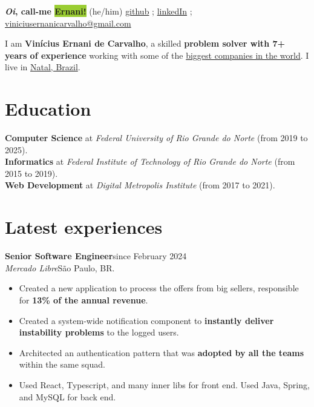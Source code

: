 \documentclass[12pt]{article}
\newcommand{\curiosity}[1]{\colorbox{YellowGreen}{#1}}
\newcommand{\highlight}[1]{#1}
\newcommand{\educationentry}[3]{\textbf{#1} at \textit{#2} (#3).}
\newcommand{\jobentry}[5]{\highlight{\textbf{#3}}\hfill #4\\\textit{#1}\hfill #2. #5\\\smallskip}
\newcommand{\spacer}[0]{\smallskip\hline\smallskip}
\begin{document}
\textbf{\large \textit{Oi}, call-me \curiosity{Ernani!}} {\large (he/him)} \hfill \href{https://github.com/erneani/}{github} ; \href{https://www.linkedin.com/in/vinicius-ernani/}{linkedIn} ; \href{mailto:viniciusernanicarvalho@gmail.com}{viniciusernanicarvalho@gmail.com}

\spacer

I am \textbf{Vinícius Ernani de Carvalho}, a skilled \textbf{problem solver with 7+ years of experience} working with some of the \underline{biggest companies in the world}. I live in \underline{Natal, Brazil}.

\section{Education}

\educationentry{Computer Science}{Federal University of Rio Grande do Norte}{from 2019 to 2025} \\
\educationentry{Informatics}{Federal Institute of Technology of Rio Grande do Norte}{from 2015 to 2019} \\
\educationentry{Web Development}{Digital Metropolis Institute}{from 2017 to 2021}

\section{Latest experiences}

\smallskip

\jobentry{Mercado Libre}{São Paulo, BR}{Senior Software Engineer}{since February 2024}{
    \begin{itemize}
        \item Created a new application to process the offers from big sellers, responsible for \textbf{13\% of the annual revenue}.
        \item Created a system-wide notification component to \textbf{instantly deliver instability problems} to the logged users.
        \item Architected an authentication pattern that was \textbf{adopted by all the teams} within the same squad.
        \item Used React, Typescript, and many inner libs for front end. Used Java, Spring, and MySQL for back end.
    \end{itemize}
}
\end{document}
